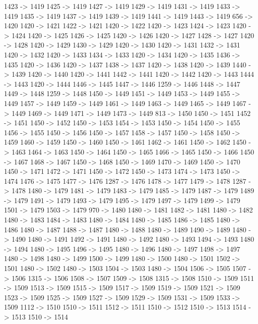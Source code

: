 {	1423 -> 1419
	1425 -> 1419
	1427 -> 1419
	1429 -> 1419
	1431 -> 1419
	1433 -> 1419
	1435 -> 1419
	1437 -> 1419
	1439 -> 1419
	1441 -> 1419
	1443 -> 1419
	656 -> 1420
	1420 -> 1421
	1422 -> 1421
	1420 -> 1422
	1420 -> 1423
	1424 -> 1423
	1420 -> 1424
	1420 -> 1425
	1426 -> 1425
	1420 -> 1426
	1420 -> 1427
	1428 -> 1427
	1420 -> 1428
	1420 -> 1429
	1430 -> 1429
	1420 -> 1430
	1420 -> 1431
	1432 -> 1431
	1420 -> 1432
	1420 -> 1433
	1434 -> 1433
	1420 -> 1434
	1420 -> 1435
	1436 -> 1435
	1420 -> 1436
	1420 -> 1437
	1438 -> 1437
	1420 -> 1438
	1420 -> 1439
	1440 -> 1439
	1420 -> 1440
	1420 -> 1441
	1442 -> 1441
	1420 -> 1442
	1420 -> 1443
	1444 -> 1443
	1420 -> 1444
	1446 -> 1445
	1447 -> 1446
	1259 -> 1446
	1448 -> 1447
	1449 -> 1448
	1259 -> 1448
	1450 -> 1449
	1451 -> 1449
	1453 -> 1449
	1455 -> 1449
	1457 -> 1449
	1459 -> 1449
	1461 -> 1449
	1463 -> 1449
	1465 -> 1449
	1467 -> 1449
	1469 -> 1449
	1471 -> 1449
	1473 -> 1449
	813 -> 1450
	1450 -> 1451
	1452 -> 1451
	1450 -> 1452
	1450 -> 1453
	1454 -> 1453
	1450 -> 1454
	1450 -> 1455
	1456 -> 1455
	1450 -> 1456
	1450 -> 1457
	1458 -> 1457
	1450 -> 1458
	1450 -> 1459
	1460 -> 1459
	1450 -> 1460
	1450 -> 1461
	1462 -> 1461
	1450 -> 1462
	1450 -> 1463
	1464 -> 1463
	1450 -> 1464
	1450 -> 1465
	1466 -> 1465
	1450 -> 1466
	1450 -> 1467
	1468 -> 1467
	1450 -> 1468
	1450 -> 1469
	1470 -> 1469
	1450 -> 1470
	1450 -> 1471
	1472 -> 1471
	1450 -> 1472
	1450 -> 1473
	1474 -> 1473
	1450 -> 1474
	1476 -> 1475
	1477 -> 1476
	1287 -> 1476
	1478 -> 1477
	1479 -> 1478
	1287 -> 1478
	1480 -> 1479
	1481 -> 1479
	1483 -> 1479
	1485 -> 1479
	1487 -> 1479
	1489 -> 1479
	1491 -> 1479
	1493 -> 1479
	1495 -> 1479
	1497 -> 1479
	1499 -> 1479
	1501 -> 1479
	1503 -> 1479
	970 -> 1480
	1480 -> 1481
	1482 -> 1481
	1480 -> 1482
	1480 -> 1483
	1484 -> 1483
	1480 -> 1484
	1480 -> 1485
	1486 -> 1485
	1480 -> 1486
	1480 -> 1487
	1488 -> 1487
	1480 -> 1488
	1480 -> 1489
	1490 -> 1489
	1480 -> 1490
	1480 -> 1491
	1492 -> 1491
	1480 -> 1492
	1480 -> 1493
	1494 -> 1493
	1480 -> 1494
	1480 -> 1495
	1496 -> 1495
	1480 -> 1496
	1480 -> 1497
	1498 -> 1497
	1480 -> 1498
	1480 -> 1499
	1500 -> 1499
	1480 -> 1500
	1480 -> 1501
	1502 -> 1501
	1480 -> 1502
	1480 -> 1503
	1504 -> 1503
	1480 -> 1504
	1506 -> 1505
	1507 -> 1506
	1315 -> 1506
	1508 -> 1507
	1509 -> 1508
	1315 -> 1508
	1510 -> 1509
	1511 -> 1509
	1513 -> 1509
	1515 -> 1509
	1517 -> 1509
	1519 -> 1509
	1521 -> 1509
	1523 -> 1509
	1525 -> 1509
	1527 -> 1509
	1529 -> 1509
	1531 -> 1509
	1533 -> 1509
	1112 -> 1510
	1510 -> 1511
	1512 -> 1511
	1510 -> 1512
	1510 -> 1513
	1514 -> 1513
	1510 -> 1514
}
